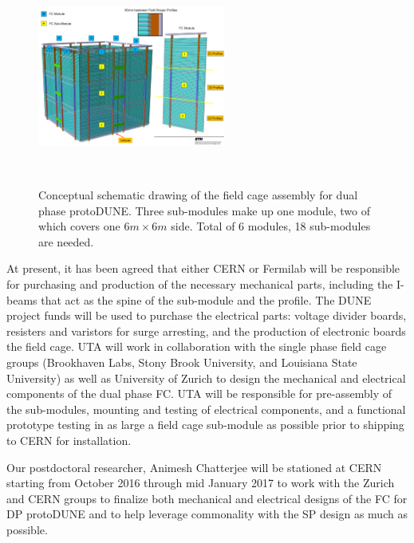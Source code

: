 \begin{figure}[htb]
\centering
\includegraphics[width=0.55\textwidth]{images/if-dp-fc.png}
\caption[]{Conceptual schematic drawing of the field cage assembly for dual phase protoDUNE. Three sub-modules make up one module, two of which covers one $6m\times 6m$ side. Total of 6 modules, 18 sub-modules are needed.}
~\label{fig:if-dp-fc}
\end{figure}

At present, it has been agreed that either CERN or Fermilab will be responsible for purchasing and production of the necessary mechanical parts, including the I-beams that act as the spine of the sub-module and the profile.  The DUNE project funds will be used to purchase the electrical parts: voltage divider boards, resisters and varistors for surge arresting, and the production of electronic boards the field cage. UTA will work in collaboration with the single phase field cage groups (Brookhaven Labs, Stony Brook University, and Louisiana State University) as well as University of Zurich to design the mechanical and electrical components of the dual phase FC. UTA will be responsible for pre-assembly of the sub-modules, mounting and testing of electrical components, and a functional prototype testing in as large a field cage sub-module as possible prior to shipping to CERN for installation.

Our postdoctoral researcher, Animesh Chatterjee will be stationed at CERN starting from October 2016 through mid January 2017 to work with the Zurich and CERN groups to finalize both mechanical and electrical designs of the FC for DP protoDUNE and to help leverage commonality with the SP design as much as possible. 


